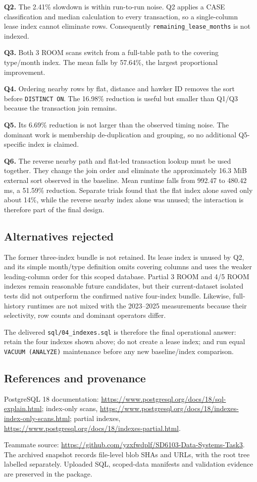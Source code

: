 \textbf{Q2.} The 2.41\% slowdown is within run-to-run noise. Q2 applies a CASE classification and
median calculation to every transaction, so a single-column lease index cannot eliminate rows.
Consequently \texttt{remaining\_lease\_months} is not indexed.

\textbf{Q3.} Both 3 ROOM scans switch from a full-table path to the covering type/month index.
The mean falls by 57.64\%, the largest proportional improvement.

\textbf{Q4.} Ordering nearby rows by flat, distance and hawker ID removes the sort before
\texttt{DISTINCT ON}. The 16.98\% reduction is useful but smaller than Q1/Q3 because the
transaction join remains.

\textbf{Q5.} Its 6.69\% reduction is not larger than the observed timing noise. The dominant work
is membership de-duplication and grouping, so no additional Q5-specific index is claimed.

\textbf{Q6.} The reverse nearby path and flat-led transaction lookup must be used together. They
change the join order and eliminate the approximately 16.3 MiB external sort observed in the
baseline. Mean runtime falls from 992.47 to 480.42 ms, a 51.59\% reduction. Separate trials found
that the flat index alone saved only about 14\%, while the reverse nearby index alone was unused;
the interaction is therefore part of the final design.

\subsection{Alternatives rejected}
The former three-index bundle is not retained. Its lease index is unused by Q2, and its simple
month/type definition omits covering columns and uses the weaker leading-column order for this
scoped database. Partial 3 ROOM and 4/5 ROOM indexes remain reasonable future candidates, but
their current-dataset isolated tests did not outperform the confirmed native four-index bundle.
Likewise, full-history runtimes are not mixed with the 2023--2025 measurements because their
selectivity, row counts and dominant operators differ.

The delivered \texttt{sql/04\_indexes.sql} is therefore the final operational answer: retain the four
indexes shown above; do not create a lease index; and run equal \texttt{VACUUM (ANALYZE)}
maintenance before any new baseline/index comparison.

\subsection{References and provenance}
PostgreSQL 18 documentation: \url{https://www.postgresql.org/docs/18/sql-explain.html}; index-only scans, \url{https://www.postgresql.org/docs/18/indexes-index-only-scans.html}; partial indexes, \url{https://www.postgresql.org/docs/18/indexes-partial.html}.

Teammate source: \url{https://github.com/yzxfwdplf/SD6103-Data-Systems-Task3}. The archived snapshot records file-level blob SHAs and URLs, with the root tree labelled separately. Uploaded SQL, scoped-data manifests and validation evidence are preserved in the package.

